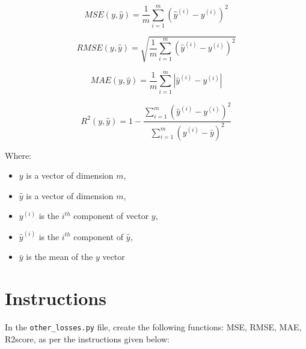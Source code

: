 \documentclass{42-en}
\begin{document}
$$
MSE(y, \hat{y}) = \frac{1}{m}\sum_{i=1}^{m}(\hat{y}^{(i)} - y^{(i)})^2
$$

$$
RMSE(y, \hat{y}) = \sqrt{\frac{1}{m}\sum_{i=1}^{m}(\hat{y}^{(i)} - y^{(i)})^2}
$$

$$
MAE(y, \hat{y}) = \frac{1}{m}\sum_{i=1}^{m}|{\hat{y}^{(i)} - y^{(i)}}|
$$

$$
R^2(y, \hat{y}) = 1 - \frac{\sum_{i=1}^{m}(\hat{y}^{(i)} - y^{(i)})^2}{\sum_{i=1}^{m}({y}^{(i)} - \bar{y})^2}
$$

Where:
\begin{itemize}
  \item $y$ is a vector of dimension $m$,
  \item $\hat{y}$ is a vector of dimension $m$,
  \item $y^{(i)}$ is the $i^{th}$ component of vector $y$,
  \item $\hat{y}^{(i)}$ is the $i^{th}$ component of $\hat{y}$,
  \item $\bar{y}$ is the mean of the $y$ vector
\end{itemize}

\newpage

\section*{Instructions}
In the \texttt{other\_losses.py} file, create the following functions: MSE, RMSE, MAE, R2score, as per the instructions given below:
\end{document}
